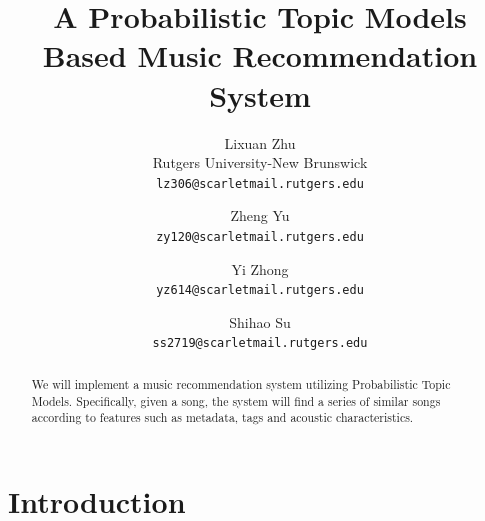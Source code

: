 \documentclass[10pt,twocolumn,letterpaper]{article}
\begin{document}
\title{A Probabilistic Topic Models Based Music Recommendation System
}

\author{Lixuan Zhu\\
Rutgers University-New Brunswick\\
{\tt\small lz306@scarletmail.rutgers.edu}
\and
Zheng Yu\\
{\tt\small zy120@scarletmail.rutgers.edu}
\and
Yi Zhong\\
{\tt\small yz614@scarletmail.rutgers.edu}
\and
Shihao Su\\
{\tt\small ss2719@scarletmail.rutgers.edu}\\
}

\maketitle

\begin{abstract}
   We will implement a music recommendation system utilizing Probabilistic Topic Models. Specifically, given a song, the system will find a series of similar songs according to features such as metadata, tags and acoustic characteristics.
\end{abstract}

\section{Introduction}
\end{document}
